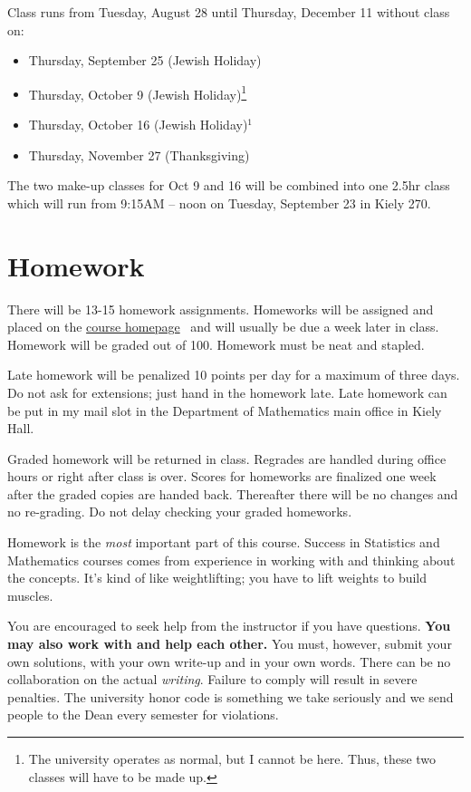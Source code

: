 \documentclass[12pt]{article}
\newcommand{\ingreen}[1]{\color{green}\textbf{#1} \color{black}}
\newcommand{\coursewebpage}{\href{https://github.com/kapelner/QC_Math_241_Fall_2014_15}{course homepage}}
\begin{document}
Class runs from Tuesday, August 28 until Thursday, December 11 without class on:

\begin{itemize}
\itemsep -0.0em 
\item Thursday, September 25 (Jewish Holiday)
\item Thursday, October 9 (Jewish Holiday)\footnote{The university operates as normal, but I cannot be here. Thus, these two classes will have to be made up.}
\item Thursday, October 16 (Jewish Holiday)$^1$
\item Thursday, November 27 (Thanksgiving)
\end{itemize}

The two make-up classes for Oct 9 and 16 will be combined into one 2.5hr class which will run from 9:15AM -- noon on Tuesday, September 23 in Kiely 270.


\section*{Homework}

There will be 13-15 homework assignments. Homeworks will be assigned and placed on the \coursewebpage~ and will usually be due a week later in class. Homework will be graded out of 100. Homework must be neat and stapled. 

Late homework will be penalized 10 points per day for a maximum of three days. Do not ask for extensions; just hand in the homework late. Late homework can be put in my mail slot in the Department of Mathematics main office in Kiely Hall.

Graded homework will be returned in class. Regrades are handled during office hours or right after class is over. Scores for homeworks are finalized one week after the graded copies are handed back. Thereafter there will be no changes and no re-grading. Do not delay checking your graded homeworks.

Homework is the \textit{most} important part of this course. Success in Statistics and Mathematics courses comes from experience in working with and thinking about the concepts. It's kind of like weightlifting; you have to lift weights to build muscles.

You are encouraged to seek help from the instructor if you have questions. \ingreen{You may also work with and help each other.} You must, however, submit your own solutions, with your own write-up and in your own words. There can be no collaboration on the actual \textit{writing}. Failure to comply will result in severe penalties. The university honor code is something we take seriously and we send people to the Dean every semester for violations.
\end{document}
